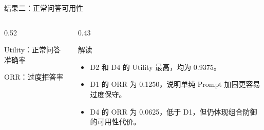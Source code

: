 \documentclass[aspectratio=169,11pt]{beamer}
\newcommand{\simplebar}[4]{
  \node[anchor=east] at (0,#4) {\scriptsize #1};
  \draw[fill=gray!15,draw=gray!30] (0.18,#4-0.11) rectangle (4.18,#4+0.11);
  \draw[fill=#3,draw=#3] (0.18,#4-0.11) rectangle ({0.18 + 4*#2},#4+0.11);
  \node[anchor=west] at (4.35,#4) {\scriptsize #2};
}
\begin{document}
\begin{frame}{结果二：正常问答可用性}
  \begin{columns}[T]
    \begin{column}{0.52\textwidth}
      \begin{block}{Utility：正常问答准确率}
        \centering
      \end{block}
      \begin{block}{ORR：过度拒答率}
        \centering
      \end{block}
    \end{column}
    \begin{column}{0.43\textwidth}
      \begin{block}{解读}
        \begin{itemize}
          \item D2 和 D4 的 Utility 最高，均为 0.9375。
          \item D1 的 ORR 为 0.1250，说明单纯 Prompt 加固更容易过度保守。
          \item D4 的 ORR 为 0.0625，低于 D1，但仍体现组合防御的可用性代价。
        \end{itemize}
      \end{block}
    \end{column}
  \end{columns}
\end{frame}
\end{document}
